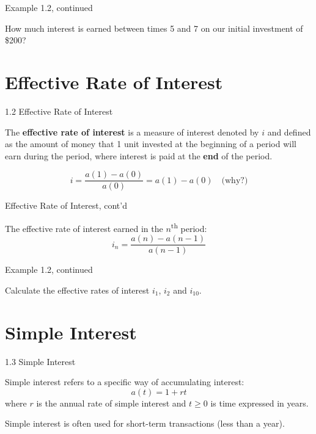 \documentclass{beamer}
\begin{document}
\begin{frame}{Example 1.2, continued}

How much interest is earned between times 5 and 7 on our initial investment of \$200?

\vfill
\end{frame}

\section{Effective Rate of Interest}

\begin{frame}{1.2 Effective Rate of Interest}

\begin{defn}
The \textbf{effective rate of interest} is a measure of interest denoted by $i$ and defined as the amount of money that 1 unit invested at the beginning of a period will earn during the period, where interest is paid at the \textbf{end} of the period.
\end{defn}

\[
i = \frac{a(1) - a(0)}{a(0)} = a(1) - a(0) \quad \text{(why?)}
\]

\end{frame}

\begin{frame}{Effective Rate of Interest, cont'd}

The effective rate of interest earned in the $n$\textsuperscript{th} period:
\[
i_n = \frac{a(n) - a(n-1)}{a(n-1)}
\]

\end{frame}

\begin{frame}{Example 1.2, continued}

Calculate the effective rates of interest $i_1$, $i_2$ and $i_{10}$.

\vfill
\end{frame}

\section{Simple Interest}

\begin{frame}{1.3 Simple Interest}

Simple interest refers to a specific way of accumulating interest:
\[
a(t) = 1 + rt
\]
where $r$ is the annual rate of simple interest and $t \ge 0$ is time expressed in years.

\bigskip
Simple interest is often used for short-term transactions (less than a year).

\end{frame}
\end{document}

